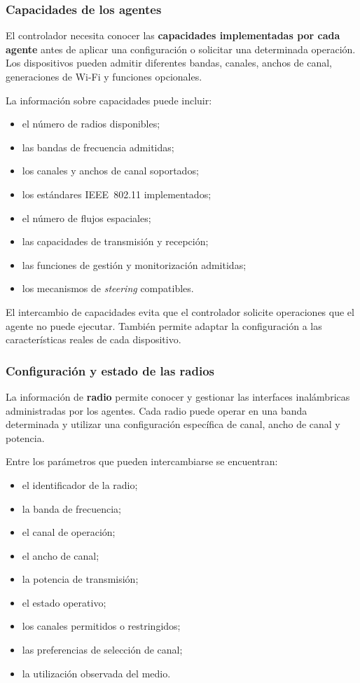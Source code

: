 \subsubsection*{Capacidades de los agentes}

El controlador necesita conocer las
\textbf{capacidades implementadas por cada agente} antes de aplicar una
configuración o solicitar una determinada operación. Los dispositivos
pueden admitir diferentes bandas, canales, anchos de canal, generaciones
de Wi-Fi y funciones opcionales.

La información sobre capacidades puede incluir:

\begin{itemize}
    \item el número de radios disponibles;
    \item las bandas de frecuencia admitidas;
    \item los canales y anchos de canal soportados;
    \item los estándares IEEE~802.11 implementados;
    \item el número de flujos espaciales;
    \item las capacidades de transmisión y recepción;
    \item las funciones de gestión y monitorización admitidas;
    \item los mecanismos de \textit{steering} compatibles.
\end{itemize}

El intercambio de capacidades evita que el controlador solicite
operaciones que el agente no puede ejecutar. También permite adaptar la
configuración a las características reales de cada dispositivo.


\subsubsection*{Configuración y estado de las radios}

La información de \textbf{radio} permite conocer y gestionar las
interfaces inalámbricas administradas por los agentes. Cada radio puede
operar en una banda determinada y utilizar una configuración específica
de canal, ancho de canal y potencia.

Entre los parámetros que pueden intercambiarse se encuentran:

\begin{itemize}
    \item el identificador de la radio;
    \item la banda de frecuencia;
    \item el canal de operación;
    \item el ancho de canal;
    \item la potencia de transmisión;
    \item el estado operativo;
    \item los canales permitidos o restringidos;
    \item las preferencias de selección de canal;
    \item la utilización observada del medio.
\end{itemize}

